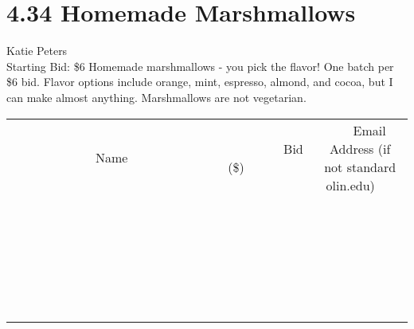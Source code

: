 \documentclass[11pt]{article}
\begin{document}
\section*{4.34 Homemade Marshmallows}
Katie Peters
\\
Starting Bid: \$6
\newline
Homemade marshmallows - you pick the flavor! One batch per \$6 bid. Flavor options include orange, mint, espresso, almond, and cocoa, but I can make almost anything. Marshmallows are not vegetarian.
\\[6ex]
\begin{tabular}{c c c}
~~~~~~~~~~~~~Name~~~~~~~~~~~~~ & ~~~~~~~~~Bid (\$)~~~~~~~~~  & ~~~Email Address (if not standard olin.edu)~~~\\
 & & \\
\hline
 & & \\
\hline
 & & \\
\hline
 & & \\
\hline
 & & \\
\hline
 & & \\
\hline
 & & \\
\hline
 & & \\
\hline
 & & \\
\hline
 & & \\
\hline
 & & \\
\hline
 & & \\
\hline
 & & \\
\hline
 & & \\
\hline
 & & \\
\hline
 & & \\
\hline
 & & \\
\hline
 & & \\
\hline
 & & \\
\hline
 & & \\
\hline
 & & \\
\hline
 & & \\
\hline
 & & \\
\hline
 & & \\
\hline
 & & \\
\hline
 & & \\
\hline
\end{tabular}
\newpage
\end{document}
